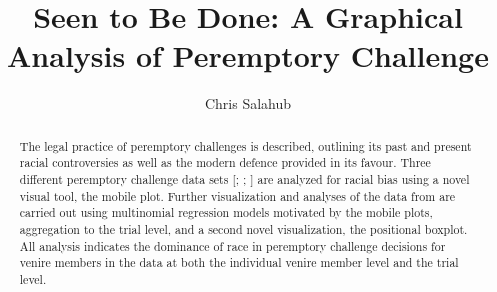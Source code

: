 \documentclass[12pt]{article}
\title{Seen to Be Done: A Graphical Analysis of Peremptory Challenge}
\author{Chris Salahub}
\begin{document}
\maketitle

\begin{abstract}
The legal practice of peremptory challenges is described, outlining its past and present racial controversies as well as the
modern defence provided in its favour. Three different peremptory challenge data sets
[\cite{JurySunshineProj}; \cite{StubbornLegacy};
\cite{PerempChalMurder}] are analyzed for racial bias using a novel
visual tool, the mobile plot. Further visualization and analyses of
the data from \cite{JurySunshineProj} are carried out using multinomial
regression models motivated by the mobile plots, aggregation to the trial level, and a second novel
visualization, the positional boxplot. All analysis indicates the
dominance of race in peremptory challenge decisions for venire members in the \cite{JurySunshineProj} data at both the individual venire member level and the trial level.
\end{abstract}
 





 




\end{document}
